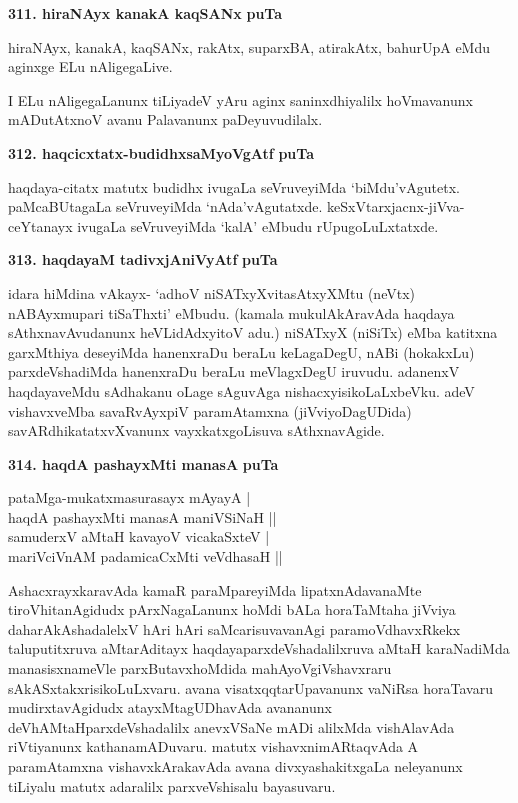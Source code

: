 \medskip
\noindent
\textbf{311. hiraNAyx kanakA kaqSANx} \hfill {\bf puTa \pageref{116a}}

\smallskip
hiraNAyx, kanakA, kaqSANx, rakAtx, suparxBA, atirakAtx, bahurUpA eMdu aginxge ELu nAligegaLive.

I ELu nAligegaLanunx tiLiyadeV yAru aginx saninxdhiyalilx hoVmavanunx mADutAtxnoV avanu Palavanunx paDeyuvudilalx.

\noindent
\textbf{312. haqcicxtatx-budidhxsaMyoVgAtf} \hfill {\bf puTa \pageref{161b}}

\smallskip
haqdaya-citatx matutx budidhx ivugaLa seVruveyiMda  `biMdu'vAgutetx. paMcaBUtagaLa seVruveyiMda `nAda'vAgutatxde. keSxVtarxjacnx-jiVva-ceYtanayx ivugaLa seVruveyiMda  `kalA' eMbudu rUpugoLuLxtatxde.

\medskip
\noindent
\textbf{313. haqdayaM tadivxjAniVyAtf} \hfill {\bf puTa \pageref{186}}

\smallskip
idara hiMdina vAkayx- `adhoV niSATxyXvitasAtxyXMtu (neVtx) nABAyxmupari tiSaThxti' eMbudu. (kamala mukulAkAravAda haqdaya sAthxnavAvudanunx heVLidAdxyitoV adu.) niSATxyX (niSiTx) eMba katitxna garxMthiya deseyiMda hanenxraDu beraLu keLagaDegU, nABi (hokakxLu) parxdeVshadiMda hanenxraDu beraLu meVlagxDegU iruvudu. adanenxV haqdayaveMdu sAdhakanu oLage sAguvAga nishacxyisikoLaLxbeVku. adeV vishavxveMba savaRvAyxpiV paramAtamxna (jiVviyoDagUDida) savARdhikatatxvXvanunx vayxkatxgoLisuva sAthxnavAgide.

\medskip
\noindent
\textbf{314. haqdA pashayxMti manasA} \hfill {\bf puTa \pageref{205a}}

\begin{shloka}
pataMga-mukatxmasurasayx mAyayA |\\
haqdA pashayxMti manasA maniVSiNaH ||\\
samuderxV aMtaH kavayoV vicakaSxteV |\\
mariVciVnAM padamicaCxMti veVdhasaH ||
\end{shloka}


AshacxrayxkaravAda kamaR paraMpareyiMda lipatxnAdavanaMte tiroVhitanAgidudx pArxNagaLanunx hoMdi bALa horaTaMtaha jiVviya daharAkAshadalelxV hAri hAri saMcarisuvavanAgi paramoVdhavxRkekx taluputitxruva aMtarAditayx haqdayaparxdeVshadalilxruva aMtaH karaNadiMda manasisxnameVle parxButavxhoMdida mahAyoVgiVshavxraru sAkASxtakxrisikoLuLxvaru. avana visatxqqtarUpavanunx vaNiRsa horaTavaru mudirxtavAgidudx atayxMtagUDhavAda avananunx deVhAMtaHparxdeVshadalilx anevxVSaNe mADi alilxMda vishAlavAda riVtiyanunx kathanamADuvaru. matutx vishavxnimARtaqvAda A paramAtamxna vishavxkArakavAda avana divxyashakitxgaLa neleyanunx tiLiyalu matutx adaralilx parxveVshisalu bayasuvaru.

